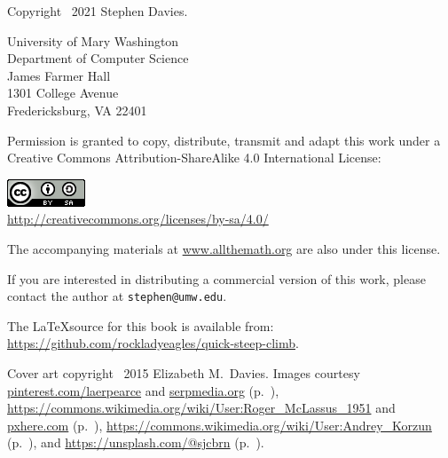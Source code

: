 
\thispagestyle{empty}

Copyright \textcopyright \ 2021 Stephen Davies.

\bigskip

University of Mary Washington\\
Department of Computer Science\\
James Farmer Hall\\
1301 College Avenue\\
Fredericksburg, VA  22401

\vspace{.4in}

Permission is granted to copy, distribute, transmit and adapt this work under a
Creative Commons Attribution-ShareAlike 4.0 International License:

\begin{center}
\includegraphics{cc_license.png}\\
\smallskip
\url{http://creativecommons.org/licenses/by-sa/4.0/}
\end{center}

The accompanying materials at \url{www.allthemath.org} are also under this
license.

\vspace{.2in}
If you are interested in distributing a commercial version of this work, please
contact the author at \texttt{stephen@umw.edu}.

\vspace{.4in}
The \LaTeX source for this book is available from:
\url{https://github.com/rockladyeagles/quick-steep-climb}.


\vspace{.7in}
Cover art copyright \textcopyright \ 2015 Elizabeth M.~Davies.
Images courtesy \url{pinterest.com/laerpearce} and \url{serpmedia.org}
(p.~\pageref{tacoma}),
\url{https://commons.wikimedia.org/wiki/User:Roger\_McLassus\_1951} and
\url{pxhere.com} (p.~\pageref{slinky}),
\url{https://commons.wikimedia.org/wiki/User:Andrey\_Korzun}
(p.~\pageref{orchard}), and \url{https://unsplash.com/@sjcbrn}
(p.~\pageref{fig:stormtrooper}).
